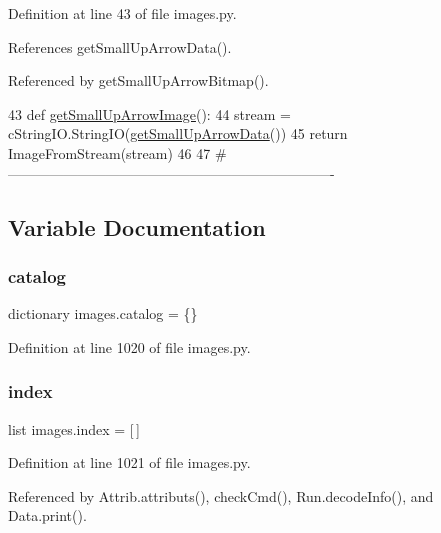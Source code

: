 Definition at line 43 of file images.\+py.



References get\+Small\+Up\+Arrow\+Data().



Referenced by get\+Small\+Up\+Arrow\+Bitmap().


\begin{DoxyCode}
43 \textcolor{keyword}{def }\hyperlink{namespaceimages_a54f4855e6e5fab39abeede5398a86eb0}{getSmallUpArrowImage}():
44     stream = cStringIO.StringIO(\hyperlink{namespaceimages_a2522e9e21e8cfb2a4f7473e90710926a}{getSmallUpArrowData}())
45     \textcolor{keywordflow}{return} ImageFromStream(stream)
46 
47 \textcolor{comment}{#----------------------------------------------------------------------}
\end{DoxyCode}


\subsection{Variable Documentation}
\mbox{\label{namespaceimages_a284ad62ca886e6f99cb88faae84382f7}} 
\subsubsection{\texorpdfstring{catalog}{catalog}}
{\footnotesize\ttfamily dictionary images.\+catalog = \{\}}



Definition at line 1020 of file images.\+py.

\mbox{\label{namespaceimages_a54407fd574970b3178647ae096321a57}} 
\subsubsection{\texorpdfstring{index}{index}}
{\footnotesize\ttfamily list images.\+index = \mbox{[}$\,$\mbox{]}}



Definition at line 1021 of file images.\+py.



Referenced by Attrib.\+attributs(), check\+Cmd(), Run.\+decode\+Info(), and Data.\+print().


